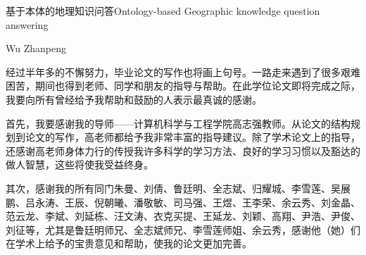 \documentclass[nomlist,masters,openany]{seuthesix}
\begin{document}
\title{\quad}{基于本体的地理知识问答}{\quad}{Ontology-based Geographic knowledge question answering}
\author{张赏}{Wu Zhanpeng}
\makebigcover
\makecover


\tableofcontents
\listofothers

\mainmatter







%



\acknowledgement
经过半年多的不懈努力，毕业论文的写作也将画上句号。一路走来遇到了很多艰难困苦，期间也得到老师、同学和朋友的指导与帮助。在此学位论文即将完成之际，我要向所有曾经给予我帮助和鼓励的人表示最真诚的感谢。

首先，我要感谢我的导师——计算机科学与工程学院高志强教师。从论文的结构规划到论文的写作，高老师都给予我非常丰富的指导建议。除了学术论文上的指导，还感谢高老师身体力行的传授我许多科学的学习方法、良好的学习习惯以及豁达的做人智慧，这些将使我受益终身。

其次，感谢我的所有同门朱曼、刘倩、鲁廷明、全志斌、归耀城、李雪莲、吴展鹏、吕永涛、王辰、倪朝曦、潘敬敏、司马强、王煜、王李荣、余云秀、刘金晶、范云龙、李斌、刘延栋、汪文涛、衣克买提、王延龙、刘颖、高翔、尹浩、尹俊、刘征等，尤其是鲁廷明师兄、全志斌师兄、李雪莲师姐、余云秀，感谢他（她）们在学术上给予的宝贵意见和帮助，使我的论文更加完善。
\end{document}
